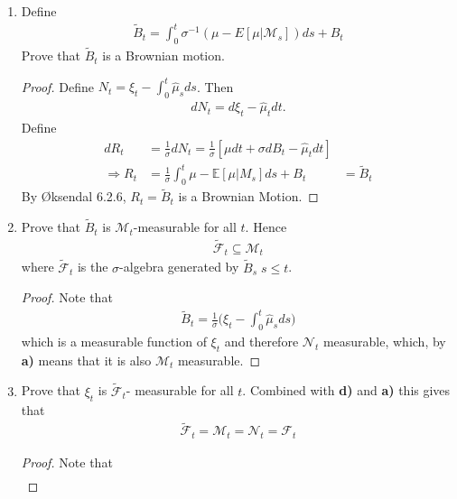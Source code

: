 \documentclass[11pt]{article}
\newcommand{\fcal}{\mathcal{F}}
\newcommand{\ncal}{\mathcal{N}}
\newcommand{\mcal}{\mathcal{M}}
\newcommand{\gt}{\theta}
\newcommand{\gs}{\sigma}
\newcommand{\E}{\mathbb{E}}
\newcommand{\imp}{\Rightarrow}
\begin{document}
\begin{enumerate}
\begin{proof}
\begin{align*}
&=\frac{\gs^2 \bar{\mu}}{\gs^2 +a^2 t} + \frac{a^2 \xi_t}{\gs^2 + a^2 t}\\
&= (\bar{\mu}\gt + \xi_t \gs^{-2})(\gt+ \gs^{-2} t)^{-1}
\end{align*}
as expected.
\end{proof}
\item Define 
\begin{align*}
\widetilde { B } _ { t } = \int _ { 0 } ^ { t } \sigma ^ { - 1 } ( \mu - E [ \mu | \mathcal { M } _ { s } ] ) d s + B _ { t }
\end{align*}
Prove that $\widetilde{B}_t$ is a Brownian motion.
\begin{proof}
Define $N_t = \xi_t - \int_0^t \hat{\mu}_s ds$.  Then
\begin{align*}
dN_t = d \xi_t - \hat{\mu}_t dt.
\end{align*}
Define 
\begin{align*}
dR_t &= \frac{1}{\gs} dN_t = \frac{1}{\gs}[\mu dt + \gs dB_t - \hat{\mu}_t dt] \\
\imp R_t &=\frac{1}{\gs} \int_0^t  \mu -\E[\mu | M_s] ds + B_t
&= \widetilde{B}_t
\end{align*}
By \O ksendal 6.2.6, $R_t = \widetilde{B}_t$ is a Brownian Motion.
\end{proof}
\item Prove that $\widetilde{B}_t$ is $\mcal_t$-measurable for all $t$.  Hence
\begin{align*}
\widetilde{\fcal}_t \subseteq \mcal_t
\end{align*}
where $\widetilde{\fcal}_t$ is the $\gs$-algebra generated by $\widetilde{B}_s \; s \leq t$.
\begin{proof}
Note that
\begin{align*}
\widetilde{B}_t = \frac{1}{\gs} \big( \xi_t - \int_0^t \hat{\mu}_s ds \big)
\end{align*}
which is a measurable function of $\xi_t$ and therefore $\ncal_t$ measurable, which, by \textbf{a)} means that it is also $\mcal_t$ measurable.
\end{proof}
\item Prove that $\xi_t$ is $\widetilde{\fcal}_t$- measurable for all $t$.  Combined with \textbf{d)} and \textbf{a)} this gives that
\begin{align*}
\widetilde { \mathcal { F } } _ { t } = \mathcal { M } _ { t } = \mathcal { N } _ { t } = \mathcal { F } _ { t }
\end{align*}
\begin{proof}
Note that
\begin{align*}

\end{align*}
\end{proof}
\end{enumerate}
\end{document}
